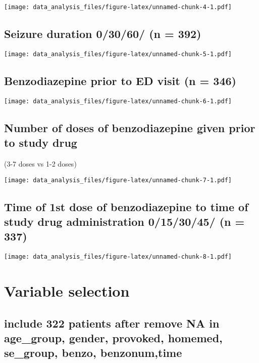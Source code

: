 \documentclass[
]{article}
\begin{document}
\texttt{[image: data\_analysis\_files/figure-latex/unnamed-chunk-4-1.pdf]}

\hypertarget{seizure-duration-03060-n-392}{%
\subsection{Seizure duration 0/30/60/ (n =
392)}\label{seizure-duration-03060-n-392}}

\texttt{[image: data\_analysis\_files/figure-latex/unnamed-chunk-5-1.pdf]}

\hypertarget{benzodiazepine-prior-to-ed-visit-n-346}{%
\subsection{Benzodiazepine prior to ED visit (n =
346)}\label{benzodiazepine-prior-to-ed-visit-n-346}}

\texttt{[image: data\_analysis\_files/figure-latex/unnamed-chunk-6-1.pdf]}

\hypertarget{number-of-doses-of-benzodiazepine-given-prior-to-study-drug}{%
\subsection{Number of doses of benzodiazepine given prior to study
drug}\label{number-of-doses-of-benzodiazepine-given-prior-to-study-drug}}

(3-7 doses vs 1-2 doses)

\texttt{[image: data\_analysis\_files/figure-latex/unnamed-chunk-7-1.pdf]}

\hypertarget{time-of-1st-dose-of-benzodiazepine-to-time-of-study-drug-administration-0153045-n-337}{%
\subsection{Time of 1st dose of benzodiazepine to time of study drug
administration 0/15/30/45/ (n =
337)}\label{time-of-1st-dose-of-benzodiazepine-to-time-of-study-drug-administration-0153045-n-337}}

\texttt{[image: data\_analysis\_files/figure-latex/unnamed-chunk-8-1.pdf]}

\hypertarget{variable-selection}{%
\section{Variable selection}\label{variable-selection}}

\hypertarget{include-322-patients-after-remove-na-in-age_group-gender-provoked-homemed-se_group-benzo-benzonumtime}{%
\subsection{include 322 patients after remove NA in age\_group, gender,
provoked, homemed, se\_group, benzo,
benzonum,time}\label{include-322-patients-after-remove-na-in-age_group-gender-provoked-homemed-se_group-benzo-benzonumtime}}
\end{document}
